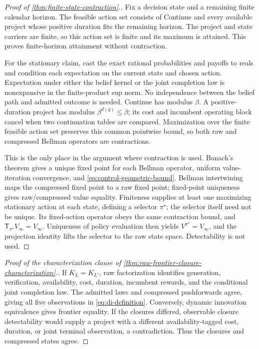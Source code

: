 \begin{proof}[Proof of \cref{thm:finite-state-contraction}.]
Fix a decision state and a remaining finite calendar horizon.  The feasible
action set consists of Continue and every available project whose positive
duration fits the remaining horizon.  The project and state carriers are
finite, so this action set is finite and its maximum is attained.  This proves
finite-horizon attainment without contraction.

For the stationary claim, cast the exact rational probabilities and payoffs
to reals and condition each expectation on the current state and chosen
action.  Expectation under either the belief kernel or the joint completion
law is nonexpansive in the finite-product sup norm.  No independence between
the belief path and admitted outcome is needed.  Continue has modulus
\(\beta\).  A positive-duration project has modulus
\(\beta^{d(q)}\le\beta\); its cost and incumbent operating block cancel when
two continuation tables are compared.  Maximization over the finite feasible
action set preserves this common pointwise bound, so both raw and compressed
Bellman operators are contractions.

This is the only place in the argument where contraction is used.  Banach's
theorem gives a unique fixed point for each Bellman operator, uniform value-
iteration convergence, and \eqref{eq:control-geometric-bound}.  Bellman
intertwining maps the compressed fixed point to a raw fixed point; fixed-point
uniqueness gives raw/compressed value equality.  Finiteness supplies at least
one maximizing stationary action at each state, defining a selector
\(\pi^\star\); the selector itself need not be unique.  Its fixed-action
operator obeys the same contraction bound, and
\(\mathsf T_{\pi^\star}V_\infty=V_\infty\).  Uniqueness of policy evaluation
then yields \(V^{\pi^\star}=V_\infty\), and the projection identity lifts the
selector to the raw state space.  Detectability is not used.
\end{proof}

\begin{proof}[Proof of the characterization clause of
\cref{thm:raw-frontier-closure-characterization}.]
If \(K_L=K_{L'}\), raw factorization identifies generation, verification,
availability, cost, duration, incumbent rewards, and the conditional joint
completion law.  The admitted laws and compressed pushforwards agree, giving
all five observations in \eqref{eq:di-definition}.  Conversely, dynamic
innovation equivalence gives frontier equality.  If the closures differed,
observable closure detectability would supply a project with a different
availability-tagged cost, duration, or joint terminal observation, a
contradiction.  Thus the closures and compressed states agree.
\end{proof}

